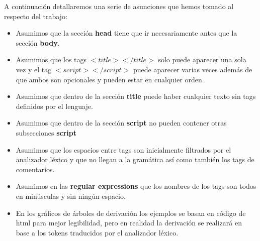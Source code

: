 
A continuaci\'on detallaremos una serie de asunciones que hemos tomado al respecto del trabajo:

\begin{itemize}

\item{  Asumimos que la secci\'on \textbf{head} tiene que ir necesariamente antes que la secci\'on \textbf{body}.
}

\item{  Asumimos que los tags $<title></title>$ solo puede aparecer una sola vez y el tag $ <script></script>$ puede aparecer varias veces adem\'as de que ambos son opcionales y pueden estar en cualquier orden.
}

\item{  Asumimos que dentro de la secci\'on \textbf{title} puede haber cualquier texto sin tags definidos por el lenguaje.
}

\item{  Asumimos que dentro de la secci\'on \textbf{script} no pueden contener otras subsecciones \textbf{script}
}

\item{  Asumimos que los espacios entre tags son inicialmente filtrados por el analizador l\'exico y que no llegan a la gram\'atica as\'i como tambi\'en los tags de comentarios.
}

\item{  Asumimos en las \textbf{regular expressions} que los nombres de los tags son todos en min\'usculas y sin ning\'un espacio.
}

\item{  En los gr\'aficos de \'arboles de derivaci\'on los ejemplos se basan en c\'odigo de html para mejor legibilidad, pero en realidad la derivaci\'on se realizar\'a en base a los tokens traducidos por el analizador l\'exico.
}

\end{itemize}
